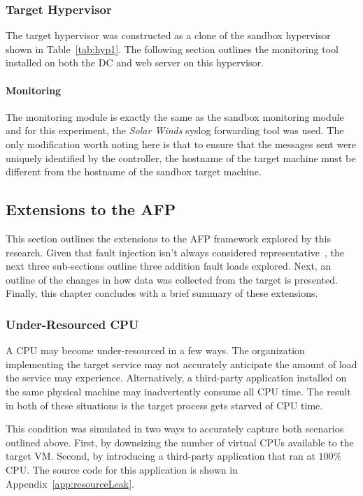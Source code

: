 \subsubsection{Target Hypervisor} \label{sec:target}
The target hypervisor was constructed as a clone of the sandbox hypervisor
shown in Table~\ref{tab:hyp1}.  The following section outlines the monitoring
tool installed on both the \ac{DC} and web server on this hypervisor.

\paragraph{Monitoring} \label{sec:targetMonitoringTool}
The monitoring module is exactly the same as the sandbox monitoring module and
for this experiment, the \emph{Solar Winds} syslog forwarding tool was used.
The only modification worth noting here is that to ensure that the messages
sent were uniquely identified by the controller, the hostname of the target
machine must be different from the hostname of the sandbox target machine.

\setcounter{secnumdepth}{3}

\subsection{Extensions to the \ac{AFP}} \label{sec:extensions}
This section outlines the extensions to the \ac{AFP} framework explored by this
research.  Given that fault injection isn't always considered
representative~\cite{kikuchi2014}, the next three sub-sections outline three
addition fault loads explored.  Next, an outline of the changes in how data was
collected from the target is presented.  Finally, this chapter concludes with a 
brief summary of these extensions.

\subsubsection{Under-Resourced \ac{CPU}} \label{sec:extUnderResourcedCPU}
A \ac{CPU} may become under-resourced in a few ways.  The organization
implementing the target service may not accurately anticipate the amount of
load the service may experience.  Alternatively, a third-party application
installed on the same physical machine may inadvertently consume all \ac{CPU}
time.  The result in both of these situations is the target process gets
starved of \ac{CPU} time.

This condition was simulated in two ways to accurately capture both scenarios
outlined above.  First, by downsizing the number of virtual \ac{CPU}s available
to the target \ac{VM}.  Second, by introducing a third-party application that
ran at $100\%$ \ac{CPU}.  The source code for this application is shown in
Appendix~\ref{app:resourceLeak}.

